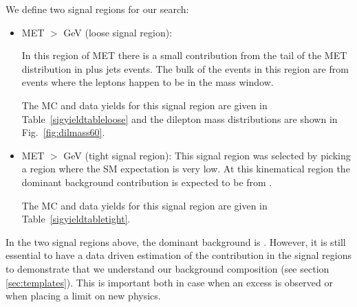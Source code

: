 We define two signal regions for our search:
\begin{itemize}
\item MET $>$ \signalmetl GeV (loose signal region):

In this region of MET there is a small contribution from the tail of the MET distribution 
in \Z plus jets events. 
The bulk of the events in this region are from \ttbar events where the leptons happen to be in the \Z 
mass window.


The MC and data yields for this signal region are given in Table~\ref{sigyieldtableloose} and the dilepton
mass distributions are shown in Fig.~\ref{fig:dilmass60}.



\item MET $>$ \signalmett GeV (tight signal region):
This signal region was selected by picking a region where the SM 
expectation is very low.
At this kinematical region the dominant background contribution is expected to be from \ttbar.

The MC and data yields for this signal region are given in Table~\ref{sigyieldtabletight}.
\end{itemize}

In the two signal regions above, the dominant background is \ttbar. 
However, it is still essential to have a data driven estimation of the \Z contribution
in the signal regions to demonstrate that we understand our background composition (see section \ref{sec:templates}).
This is important both in case when an excess is observed or when placing a limit on new physics.



